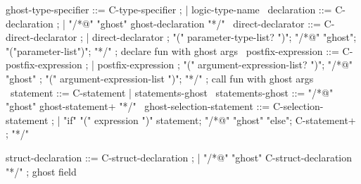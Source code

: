 \begin{syntax}

  ghost-type-specifier ::= C-type-specifier ;
  | {logic-type-name} \
  declaration ::= C-declaration ;
  | "/*@" "ghost" ghost-declaration "*/" \
  direct-declarator ::= C-direct-declarator ;
    | direct-declarator ;
    "(" parameter-type-list? ")";
        {"/*@" "ghost";
          "("parameter-list")";
          "*/"} ; declare fun with ghost args
        \
  postfix-expression ::= C-postfix-expression ;
    | postfix-expression ;
     "(" argument-expression-list? ")";
     {"/*@" "ghost" ;
       "(" argument-expression-list ")";
       "*/"} ; call fun with ghost args
    \
  statement ::= C-statement | statements-ghost \
  statements-ghost ::= "/*@" "ghost" ghost-statement+ "*/" \
  ghost-selection-statement ::= C-selection-statement ;
    | "if" "(" expression ")" statement;
      {"/*@" "ghost" "else";
        C-statement+ ;
        "*/"} \

  struct-declaration ::= C-struct-declaration ;
  | "/*@" "ghost" C-struct-declaration "*/" ; ghost field

\end{syntax}

